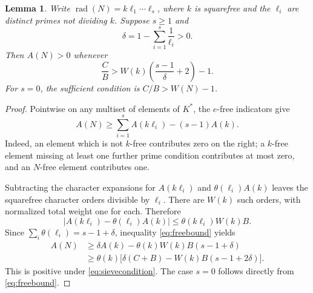 \documentclass[11pt]{article}
\newtheorem{lemma}[theorem]{Lemma}
\theoremstyle{remark}\newtheorem{remark}[theorem]{Remark}
\newcommand{\rad}{\operatorname{rad}}
\begin{document}
\begin{lemma}\label{lem:sieve}
Write $\rad(N)=k\ell_1\cdots\ell_s$, where $k$ is squarefree and the $\ell_i$ are distinct primes not dividing $k$. Suppose $s\ge1$ and
\[
 \delta=1-\sum_{i=1}^s\frac1{\ell_i}>0.
\]
Then $A(N)>0$ whenever
\begin{equation}\label{eq:sievecondition}
 \frac CB>W(k)\left(\frac{s-1}{\delta}+2\right)-1.
\end{equation}
For $s=0$, the sufficient condition is $C/B>W(N)-1$.
\end{lemma}
\begin{proof}
Pointwise on any multiset of elements of $K^*$, the $e$-free indicators give
\[
 A(N)\ge\sum_{i=1}^s A(k\ell_i)-(s-1)A(k).
\]
Indeed, an element which is not $k$-free contributes zero on the right; a $k$-free element missing at least one further prime condition contributes at most zero, and an $N$-free element contributes one.

Subtracting the character expansions for $A(k\ell_i)$ and $\theta(\ell_i)A(k)$ leaves the squarefree character orders divisible by $\ell_i$. There are $W(k)$ such orders, with normalized total weight one for each. Therefore
\[
 \left|A(k\ell_i)-\theta(\ell_i)A(k)\right|
 \le\theta(k\ell_i)W(k)B.
\]
Since $\sum_i\theta(\ell_i)=s-1+\delta$, inequality \eqref{eq:freebound} yields
\begin{align*}
 A(N)&\ge\delta A(k)-\theta(k)W(k)B(s-1+\delta)\\
 &\ge\theta(k)\bigl[\delta(C+B)-W(k)B(s-1+2\delta)\bigr].
\end{align*}
This is positive under \eqref{eq:sievecondition}. The case $s=0$ follows directly from \eqref{eq:freebound}.
\end{proof}
\end{document}
